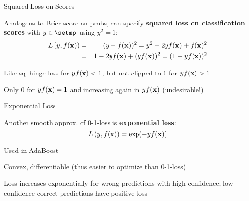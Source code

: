 \documentclass[11pt,compress,t,notes=noshow, xcolor=table]{beamer}
\begin{document}
\begin{framei}[sep=M]{Squared Loss on Scores}


  \item Analogous to Brier score on probs, can specify \textbf{squared loss on classification scores} with $y \in \setmp$ using $y^2=1$:
  \begin{eqnarray*}
  L\left(y, f(\mathbf{x})\right) &=&(y - f(\mathbf{x}))^2 = y^2 - 2yf(\mathbf{x}) + f(\mathbf{x})^2\\
  &=&1 - 2yf(\mathbf{x}) + (yf(\mathbf{x}))^2 = (1 - yf(\mathbf{x}))^2
  \end{eqnarray*}
  \item Like sq. hinge loss for $yf(\mathbf{x}) < 1$, but not clipped to $0$ for $yf(\mathbf{x})>1$
  \item Only 0 for $yf(\mathbf{x}) = 1$ and increasing again in $yf(\mathbf{x})$ (undesirable!)



\end{framei}



\begin{framei}[sep=M]{Exponential Loss}

\item Another smooth 
approx. of 0-1-loss is \textbf{exponential loss}:
$$L\left(y, f(\mathbf{x})\right) = \exp(-yf(\mathbf{x}))$$ 
\item Used in AdaBoost
\item Convex, differentiable (thus easier to optimize than 0-1-loss)
\item Loss increases exponentially for wrong predictions with high confidence; low-confidence correct predictions have positive loss


\end{framei}
\end{document}
